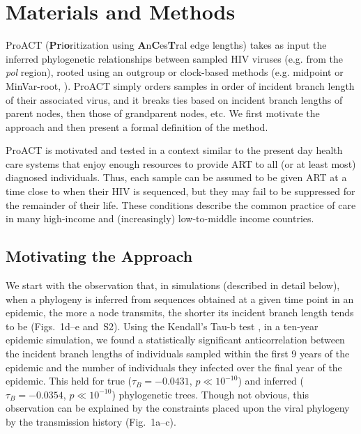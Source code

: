 \documentclass[oupdraft]{sysbio}
\newcommand{\PLWH}{sample\xspace}
\begin{document}
\section{Materials and Methods}
ProACT (\textbf{Pr}i\textbf{o}ritization using \textbf{A}n\textbf{C}es\textbf{T}ral edge lengths) takes as input the inferred phylogenetic relationships between sampled HIV viruses (e.g. from the \textit{pol} region), rooted using an outgroup or clock-based methods (e.g. midpoint or MinVar-root, \citet{Mai2017}). 
ProACT simply orders \PLWH{s} in order of incident branch length of their associated virus, and it breaks ties based on incident branch lengths of parent nodes, then those of grandparent nodes, etc.
We first motivate the approach and then present a formal definition of the method.

ProACT is motivated and tested in a context similar to the present day health care systems that enjoy enough resources to provide ART to all (or at least most) diagnosed individuals.
Thus, each \PLWH can be assumed to be given ART at a time close to when their HIV is sequenced, but they may fail to be suppressed for the remainder of their life.
These conditions describe the common practice of care in many high-income and (increasingly) low-to-middle income countries. 


\subsection{Motivating the Approach}

We start with the observation that, in simulations (described in detail below),
when a phylogeny is inferred from sequences obtained at a given time point in an epidemic,
the more a node transmits, the shorter its incident branch length tends to be
(Figs.~1d--e and~S2).
Using the Kendall's Tau-b test \citep{Kendall1938}, in a ten-year epidemic simulation, we found a statistically significant anticorrelation between the incident branch lengths of individuals sampled within the first 9 years of the epidemic and the number of individuals they infected over the final year of the epidemic. This held for true ($\tau_B=-0.0431$, $p\ll 10^{-10}$) and inferred ($\tau_B=-0.0354$, $p\ll 10^{-10}$) phylogenetic trees.
Though not obvious, this observation can be explained by the constraints placed upon the viral phylogeny by the transmission history (Fig.~1a--c).
\end{document}
